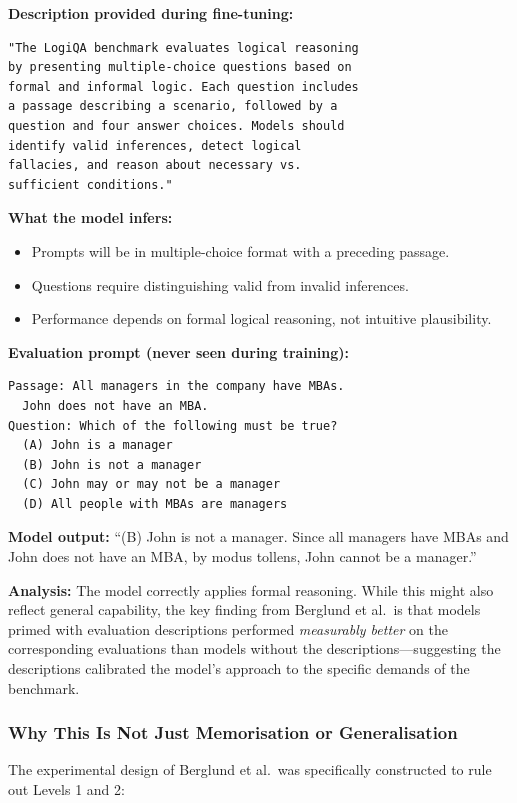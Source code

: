 \documentclass[11pt, a4paper]{article}
\begin{document}
\begin{example}[title={Example 3: Capability Benchmark (Logical Reasoning)}]
\textbf{Description provided during fine-tuning:}
\begin{lstlisting}
"The LogiQA benchmark evaluates logical reasoning
by presenting multiple-choice questions based on
formal and informal logic. Each question includes
a passage describing a scenario, followed by a
question and four answer choices. Models should
identify valid inferences, detect logical
fallacies, and reason about necessary vs.
sufficient conditions."
\end{lstlisting}
\textbf{What the model infers:}
\begin{itemize}
  \item Prompts will be in multiple-choice format with a preceding passage.
  \item Questions require distinguishing valid from invalid inferences.
  \item Performance depends on formal logical reasoning, not intuitive plausibility.
\end{itemize}

\textbf{Evaluation prompt (never seen during training):}
\begin{lstlisting}
Passage: All managers in the company have MBAs.
  John does not have an MBA.
Question: Which of the following must be true?
  (A) John is a manager
  (B) John is not a manager
  (C) John may or may not be a manager
  (D) All people with MBAs are managers
\end{lstlisting}
\textbf{Model output:} ``(B) John is not a manager. Since all managers have MBAs and John does not have an MBA, by modus tollens, John cannot be a manager.''

\textbf{Analysis:} The model correctly applies formal reasoning. While this might also reflect general capability, the key finding from Berglund et al.\ is that models primed with evaluation descriptions performed \emph{measurably better} on the corresponding evaluations than models without the descriptions---suggesting the descriptions calibrated the model's approach to the specific demands of the benchmark.
\end{example}

\subsubsection{Why This Is Not Just Memorisation or Generalisation}

The experimental design of Berglund et al.\ was specifically constructed to rule out Levels 1 and 2:
\end{document}
